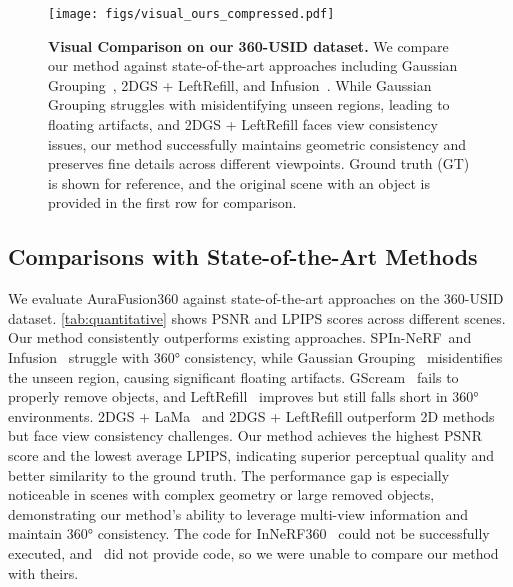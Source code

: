 \begin{figure*}[t]
    \centering
    \texttt{[image: figs/visual\_ours\_compressed.pdf]}
    \vspace{-9mm}
    \caption{\textbf{Visual Comparison on our 360-USID dataset.} We compare our method against state-of-the-art approaches including Gaussian Grouping~\citep{ye2023gaussian}, 2DGS + LeftRefill, and Infusion~\citep{liu2024infusion}. While Gaussian Grouping struggles with misidentifying unseen regions, leading to floating artifacts, and 2DGS + LeftRefill faces view consistency issues, our method successfully maintains geometric consistency and preserves fine details across different viewpoints. Ground truth (GT) is shown for reference, and the original scene with an object is provided in the first row for comparison.}
    \label{fig:visual}
\end{figure*}

\subsection{Comparisons with State-of-the-Art Methods}

We evaluate AuraFusion360 against state-of-the-art approaches on the 360-USID dataset. \cref{tab:quantitative} shows PSNR and LPIPS scores across different scenes. Our method consistently outperforms existing approaches. SPIn-NeRF~\cite{spinnerf}\footnotemark and Infusion~\cite{liu2024infusion} struggle with 360° consistency, while Gaussian Grouping~\citep{ye2023gaussian} misidentifies the unseen region, causing significant floating artifacts. GScream~\cite{wang2024gscream} fails to properly remove objects, and LeftRefill~\cite{cao2024leftrefill} improves but still falls short in 360° environments. 2DGS + LaMa~\citep{lama} and 2DGS + LeftRefill outperform 2D methods but face view consistency challenges. Our method achieves the highest PSNR score and the lowest average LPIPS, indicating superior perceptual quality and better similarity to the ground truth. The performance gap is especially noticeable in scenes with complex geometry or large removed objects, demonstrating our method's ability to leverage multi-view information and maintain 360° consistency. The code for InNeRF360~\cite{wang2023inpaintnerf360} could not be successfully executed, and~\cite{mirzaei2023reference} did not provide code, so we were unable to compare our method with theirs.




